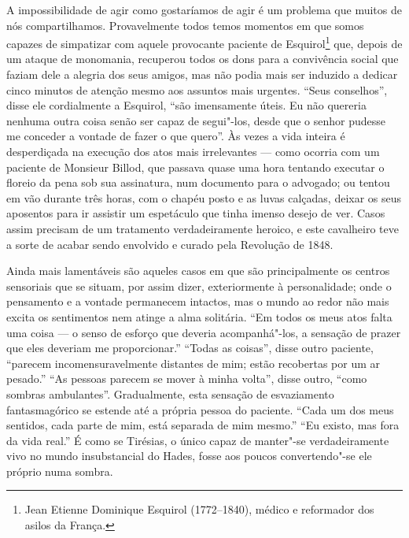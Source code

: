 A impossibilidade de agir como gostaríamos de agir é um problema que
muitos de nós compartilhamos.  Provavelmente todos temos momentos em
que somos capazes de simpatizar com aquele provocante paciente de
Esquirol\footnote{ Jean Etienne Dominique Esquirol
(1772--1840), médico e reformador dos asilos da França.}
que, depois de um ataque de monomania, recuperou todos os dons para a
convivência social que faziam dele a alegria dos seus amigos, mas não
podia mais ser induzido a dedicar cinco minutos de atenção mesmo aos
assuntos mais urgentes.  “Seus conselhos”, disse ele cordialmente a
Esquirol, “são imensamente úteis. Eu não quereria nenhuma outra coisa
senão ser capaz de segui"-los, desde que o senhor pudesse me conceder a
vontade de fazer o que quero”.  Às vezes a vida inteira é desperdiçada
na execução dos atos mais irrelevantes --- como ocorria com um paciente
de Monsieur Billod, que passava quase uma hora tentando executar o
floreio da pena sob sua assinatura, num documento para o advogado; ou
tentou em vão durante três horas, com o chapéu posto e as luvas
calçadas, deixar os seus aposentos para ir assistir um espetáculo que
tinha imenso desejo de ver.  Casos assim precisam de um tratamento
verdadeiramente heroico, e este cavalheiro teve a sorte de acabar sendo
envolvido e curado pela Revolução de 1848.  

Ainda mais lamentáveis são aqueles casos em que são principalmente os
centros sensoriais que se situam, por assim dizer, exteriormente à
personalidade; onde o pensamento e a vontade permanecem intactos, mas o
mundo ao redor não mais excita os sentimentos nem atinge a alma
solitária.  “Em todos os meus atos falta uma coisa --- o senso de esforço
que deveria acompanhá"-los, a sensação de prazer que eles deveriam
me proporcionar.” “Todas as coisas”, disse outro paciente, “parecem
incomensuravelmente distantes de mim; estão recobertas por um ar
pesado.”  “As pessoas parecem se mover à minha volta”, disse outro,
“como sombras ambulantes”.  Gradualmente, esta sensação de esvaziamento
fantasmagórico se estende até a própria pessoa do paciente. “Cada um
dos meus sentidos, cada parte de mim, está separada de mim mesmo.” “Eu
existo, mas fora da vida real.” É como se Tirésias, o único capaz de
manter"-se verdadeiramente vivo no mundo insubstancial do Hades, fosse
aos poucos convertendo"-se ele próprio numa sombra. 

